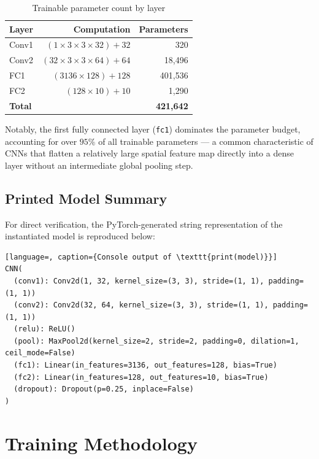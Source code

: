 \documentclass[12pt,a4paper]{report}
\begin{document}
\begin{table}[H]
\centering
\caption{Trainable parameter count by layer}
\label{tab:params}
\begin{tabular}{@{}lrr@{}}
\toprule
\textbf{Layer} & \textbf{Computation} & \textbf{Parameters} \\
\midrule
Conv1 & $(1{\times}3{\times}3{\times}32)+32$   & 320 \\
Conv2 & $(32{\times}3{\times}3{\times}64)+64$  & 18{,}496 \\
FC1   & $(3136{\times}128)+128$                 & 401{,}536 \\
FC2   & $(128{\times}10)+10$                    & 1{,}290 \\
\midrule
\textbf{Total} & & \textbf{421{,}642} \\
\bottomrule
\end{tabular}
\end{table}

Notably, the first fully connected layer (\texttt{fc1}) dominates the parameter budget, accounting for over $95\%$ of all trainable parameters — a common characteristic of CNNs that flatten a relatively large spatial feature map directly into a dense layer without an intermediate global pooling step.

\section{Printed Model Summary}
For direct verification, the PyTorch-generated string representation of the instantiated model is reproduced below:

\begin{lstlisting}[language=, caption={Console output of \texttt{print(model)}}]
CNN(
  (conv1): Conv2d(1, 32, kernel_size=(3, 3), stride=(1, 1), padding=(1, 1))
  (conv2): Conv2d(32, 64, kernel_size=(3, 3), stride=(1, 1), padding=(1, 1))
  (relu): ReLU()
  (pool): MaxPool2d(kernel_size=2, stride=2, padding=0, dilation=1, ceil_mode=False)
  (fc1): Linear(in_features=3136, out_features=128, bias=True)
  (fc2): Linear(in_features=128, out_features=10, bias=True)
  (dropout): Dropout(p=0.25, inplace=False)
)
\end{lstlisting}

\chapter{Training Methodology}
\end{document}
